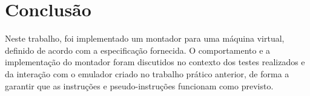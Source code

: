 \documentclass[10pt,a4paper]{article}
\numberwithin{equation}{section}
\begin{document}
\FloatBarrier

\section{Conclusão}

Neste trabalho, foi implementado um montador para uma máquina virtual, definido de acordo com a especificação fornecida. O comportamento e a implementação do montador foram discutidos no contexto dos testes realizados e da interação com o emulador criado no trabalho prático anterior, de forma a garantir que as instruções e pseudo-instruções funcionam como previsto.
\end{document}
